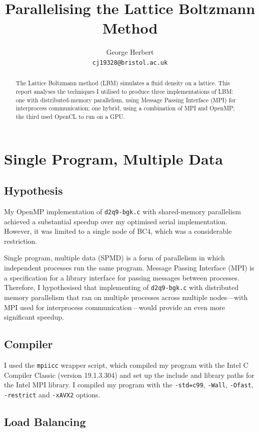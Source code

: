 \documentclass[twocolumn, a4paper]{article}
\author{
  George Herbert\\
  \texttt{cj19328@bristol.ac.uk}
}
\title{Parallelising the Lattice Boltzmann Method}
\begin{document}
\maketitle

\begin{abstract}
  The Lattice Boltzmann method (LBM) simulates a fluid density on a lattice.
  This report analyses the techniques I utilised to produce three implementations of LBM: one with distributed-memory parallelism, using Message Passing Interface (MPI) for interprocess communication; one hybrid, using a combination of MPI and OpenMP; the third used OpenCL to run on a GPU.
\end{abstract}

\section{Single Program, Multiple Data}

\subsection{Hypothesis}

My OpenMP implementation of \texttt{d2q9-bgk.c} with shared-memory parallelism achieved a substantial speedup over my optimised serial implementation.
However, it was limited to a single node of BC4, which was a considerable restriction.

Single program, multiple data (SPMD) is a form of parallelism in which independent processes run the same program.
Message Passing Interface (MPI) is a specification for a library interface for passing messages between processes.
Therefore, I hypothesised that implementing of \texttt{d2q9-bgk.c} with distributed memory parallelism that ran on multiple processes across multiple nodes---with MPI used for interprocess communication---would provide an even more significant speedup.

\subsection{Compiler}

I used the \texttt{mpiicc} wrapper script, which compiled my program with the Intel C Compiler Classic (version 19.1.3.304) and set up the include and library paths for the Intel MPI library.
I compiled my program with the \texttt{-std=c99}, \texttt{-Wall}, \texttt{-Ofast}, \texttt{-restrict} and \texttt{-xAVX2} options.

\subsection{Load Balancing}
\end{document}
